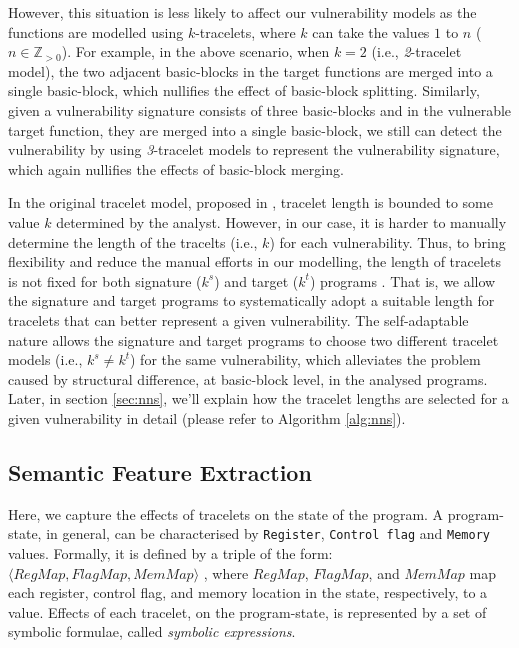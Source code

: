 However, this situation is less likely to affect our vulnerability models as the functions are modelled using $k$-tracelets, where $k$ can take the values $1$ to $n$ ($n\in\mathbb Z_{> 0}$). For example, in the above scenario, when $k=2$ (i.e., \textit{2}-tracelet model), the two adjacent basic-blocks in the target functions are merged into a single basic-block, which nullifies the effect of basic-block splitting. Similarly, given a vulnerability signature consists of three basic-blocks and in the vulnerable target function, they are merged into a single basic-block,  we still can detect the vulnerability by using \textit{3}-tracelet models to represent the vulnerability signature, which again nullifies the effects of basic-block merging. 

In the original tracelet model, proposed in \cite{david2014tracelet}, tracelet length is bounded to some value $k$ determined by the analyst. However, in our case, it is harder to manually determine the length of the tracelts (i.e., $k$) for each vulnerability. Thus, to bring flexibility and reduce the manual efforts in our modelling, the length of tracelets is not fixed for both signature ($k^s$) and target ($k^t$) programs . That is, we allow the signature and target programs to systematically adopt a suitable length for tracelets that can better represent a given vulnerability. The self-adaptable nature allows the signature and target programs to choose two different tracelet models (i.e., $k^s \neq k^t$) for the same vulnerability, which alleviates the problem caused by structural difference, at basic-block level, in the analysed programs. Later, in section \ref{sec:nns}, we'll explain how the tracelet lengths are selected for a given vulnerability in detail (please refer to Algorithm \ref{alg:nns}).  
 
\subsection{Semantic Feature Extraction} \label{subsec:sem_fea}

Here, we capture the effects of tracelets on the state of the program. A program-state, in general, can be characterised by \texttt{Register}, \texttt{Control flag} and \texttt{Memory} values. Formally, it is defined by a triple of the form:
$\langle RegMap, FlagMap, MemMap \rangle$
, where $RegMap$, $FlagMap$, and $MemMap$ map each register, control flag, and memory location in the state, respectively, to a value. Effects of each tracelet, on the program-state, is represented by a set of symbolic formulae, called \textit{symbolic expressions}.

